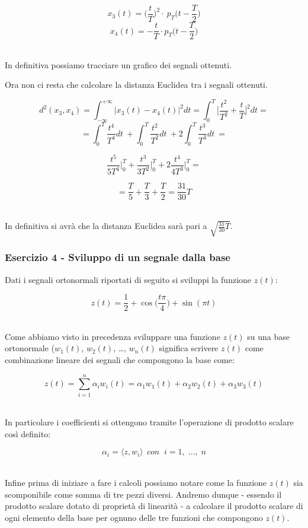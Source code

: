 \documentclass[../main.tex]{subfiles}
\begin{document}
\[x_3(t) = \bigg( \frac{t}{T}\bigg)^2 \cdot \: p_T \bigg(t - \frac{T}{2}\bigg)\]
\[x_4(t) = - \frac{t}{T} \cdot p_T \bigg(t - \frac{T}{2}\bigg) \]\

In definitiva possiamo tracciare un grafico dei segnali ottenuti.


Ora non ci resta che calcolare la distanza Euclidea tra i segnali ottenuti.

\[ d^2(x_3,x_4) = \int_{-\infty}^{+\infty}\big| x_3(t) - x_4(t)\big|^2 dt = \int_{0}^T\bigg[ \frac{t^2}{T^2} + \frac{t}{T} \bigg]^2 dt = \]
\[ = \int_0^T \frac{t^4}{T^4} dt\: + \int_0^T \frac{t^2}{T^2} dt\: + 2 \int_0^T \frac{t^3}{T^3} dt\: =  \]

\[ \frac{t^5}{5T^4} \bigg|_0^T + \frac{t^3}{3T^2} \bigg|_0^T + 2 \frac{t^4}{4T^3} \bigg|_0^T =  \]

\[ = \frac{T}{5} + \frac{T}{3} + \frac{T}{2} = \frac{31}{30}T  \]\

In definitiva si avrà che la distanza Euclidea sarà pari a $\sqrt{\frac{31}{30}T}$.

\vspace*{1.5cm}
\subsubsection{Esercizio 4 - Sviluppo di un segnale dalla base}
\label{ss14}



Dati i segnali ortonormali riportati di seguito si sviluppi la funzione $z(t)$:

\[z(t) = \frac{1}{2} + \cos\bigg(\frac{t\pi}{4}\bigg) + \sin(\pi t) \]\


Come abbiamo visto in precedenza sviluppare una funzione $z(t)$ su una base ortonormale ($w_1(t)$, $w_2(t)$, \dots, $w_n(t)$ significa scrivere $z(t)$ come combinazione lineare dei segnali che compongono la base come:

\[z(t) = \sum_{i = 1}^n \alpha_i w_i(t) = \alpha_1 w_1(t) + \alpha_2 w_2(t) + \alpha_3 w_3(t) \]\

In particolare i coefficienti si ottengono tramite l’operazione di prodotto scalare così definito:

\[ \alpha_i = \langle z, w_i \rangle \:\: \unit{con} \;\; i = 1, \;\dots,\;n \]\ 

Infine prima di iniziare a fare i calcoli possiamo notare come la funzione $z(t)$ sia scomponibile come somma di tre pezzi diversi. Andremo dunque - essendo il prodotto scalare dotato di proprietà di linearità - a calcolare il prodotto scalare di ogni elemento della base per ognuno delle tre funzioni che compongono $z(t)$.
\end{document}
